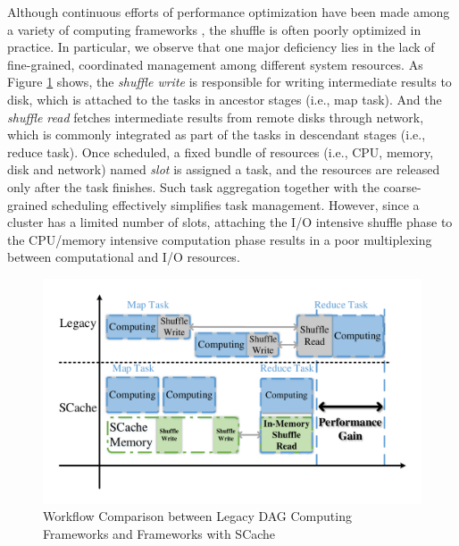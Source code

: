 Although continuous efforts of performance optimization have been made among a variety of computing frameworks \cite{sync, babu, tachyon, pacman, quincy, delay}, 
the shuffle is often poorly optimized in practice.
In particular, we observe that one major deficiency lies in the lack of fine-grained, coordinated management among different system resources.
As Figure \ref{fig:workflow} shows, the \textit{shuffle write} is responsible for writing intermediate results to disk, which is attached to the tasks in ancestor stages (i.e., map task).  
And the \textit{shuffle read} fetches intermediate results from remote disks through network, which is commonly integrated as part of the tasks in descendant stages (i.e., reduce task). 
Once scheduled, a fixed bundle of resources (i.e., CPU, memory, disk and network) named \textit{slot} is assigned a task, and the resources are released only after the task finishes.
\ifrevision
{}
\fi
Such task aggregation together with the coarse-grained scheduling effectively simplifies task management.
However, since a cluster has a limited number of slots, attaching the I/O intensive shuffle phase to the CPU/memory intensive computation phase results in a poor multiplexing between computational and I/O resources.
\begin{figure}
	\centering
	\includegraphics[width=\linewidth]{fig/workflow}
	\caption{Workflow Comparison between Legacy DAG Computing Frameworks and Frameworks with SCache}
	\label{fig:workflow}
	\vspace{-1.2em}
\end{figure}

